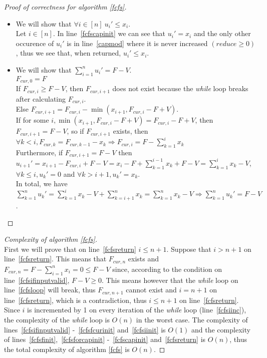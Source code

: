 \documentclass[11pt]{article}
\theoremstyle{definition}
\theoremstyle{corollary}
\theoremstyle{lemma}
\begin{document}
    \begin{proof}[Proof of correctness for algorithm \ref{fcfs}] \
       \begin{itemize}
          \item We will show that $\forall i \in [n] \: u_i' \leq x_i$. \\
          Let $i \in [n]$. In line~\ref{fcfscapinit} we can see that $u_i' = x_i$ and the only other occurence of $u_i'$
          is in line~\ref{capmod} where it is never increased $(reduce \geq 0)$, thus we see that, when returned,
          $u_i' \leq x_i$.
          \item We will show that $\sum\limits_{i=1}^{n}u_i' = F - V$. \\
          $F_{cur,0} = F$ \\
          If $F_{cur,i} \geq F - V$, then $F_{cur,i+1}$ does not exist because the \emph{while} loop breaks after calculating
          $F_{cur,i}$. \\
          Else $F_{cur,i+1} = F_{cur,i} - \min{(x_{i+1}, F_{cur,i} - F + V)}$. \\
          If for some $i, \min{(x_{i+1}, F_{cur,i} - F + V)} = F_{cur,i} - F + V$, then $F_{cur,i+1} = F - V$, so if
          $F_{cur,i+1}$ exists, then $\forall k < i, F_{cur,k} = F_{cur,k-1} - x_k \Rightarrow F_{cur,i} =
          F - \sum\limits_{k=1}^{i}x_k$ \\
          Furthermore, if $F_{cur,i+1} = F - V$ then $u_{i+1}' = x_{i+1} - F_{cur,i} + F - V =
          x_i - F + \sum\limits_{k=1}^{i-1}x_k + F - V = \sum\limits_{k=1}^{i}x_k - V$, $\forall k \leq i, u_k' = 0$
          and $\forall k > i+1, u_k' = x_k$. \\
          In total, we have $\sum\limits_{k=1}^{n}u_k' = \sum\limits_{k=1}^{i}x_k - V + \sum\limits_{k=i+1}^{n}x_k =
          \sum\limits_{k=1}^{n}x_k - V \Rightarrow \sum\limits_{k=1}^{n}u_k' = F - V$.
       \end{itemize}
    \end{proof}
    \begin{proof}[Complexity of algorithm \ref{fcfs}] \ \\
       First we will prove that on line~\ref{fcfsreturn} $i \leq n+1$. Suppose that $i > n+1$ on line~\ref{fcfsreturn}. This
       means that $F_{cur,n}$ exists and $F_{cur,n} = F - \sum\limits_{i=1}^{n}x_i = 0 \leq F - V$ since, according to the
       condition on line~\ref{fcfsifinputvalid}, $F - V \geq 0$. This means however that the \emph{while} loop on
       line~\ref{fcfsloop} will break, thus $F_{cur,n+1}$ cannot exist and $i = n + 1$ on line~\ref{fcfsreturn}, which is a
       contradiction, thus $i \leq n+1$ on line~\ref{fcfsreturn}. Since $i$ is incremented by 1 on every iteration of the
       \emph{while} loop (line~\ref{fcfsiinc}), the complexity of the \emph{while} loop is $O(n)$ in the worst case. The
       complexity of lines~\ref{fcfsifinputvalid} -~\ref{fcfsfcurinit} and~\ref{fcfsiinit} is $O(1)$ and the complexity of
       lines~\ref{fcfsfinit},~\ref{fcfsforcapinit} -~\ref{fcfscapinit} and~\ref{fcfsreturn} is $O(n)$, thus the total
       complexity of algorithm \ref{fcfs} is $O(n)$.
    \end{proof}
\end{document}
